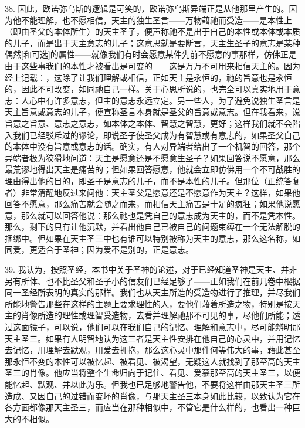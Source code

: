 38. 因此，欧诺弥乌斯的逻辑是可笑的，欧诺弥乌斯异端正是从他那里产生的。因为他不能理解，也不愿相信，天主的独生圣言——万物藉祂而受造——是本性上（即由圣父的本体所生）的天主圣子，便声称祂不是出于自己的本性或本体或本质的儿子，而是出于天主意志的儿子；这意思就是要断言，天主生圣子的意志是某种偶然[和可选]的属性——就像我们有时会愿意某件先前不愿意的事那样，仿佛正是由于这些事我们的本性才被看出是可变的——这是万万不可用来相信天主的。因为经上记载：，这除了让我们理解或相信，正如天主是永恒的，祂的旨意也是永恒的，因此不可改变，如同祂自己一样。关于心思所说的，也完全可以真实地用于意志：人心中有许多意志，但主的意志永远立定。另一些人，为了避免说独生圣言是天主旨意或意志的儿子，便宣称圣言本身就是圣父的旨意或意志。但在我看来，说旨意之旨意、意志之意志，如本体之本体、智慧之智慧，更好；这样我们就不会陷入我们已经驳斥过的谬论，即说圣子使圣父成为有智慧或有意志的，如果圣父自己的本体中没有旨意或意志的话。确实，有人对异端者给出了一个机智的回答，那个异端者极为狡猾地问道：天主是愿意还是不愿意生圣子？如果回答说不愿意，那么最荒谬地得出天主是痛苦的；但如果回答愿意，他就会立即仿佛用一个不可战胜的理由得出他的目的，即圣子是意志的儿子，而不是本性的儿子。但那位（正统答复者）非常清醒地反过来问他：天主圣父是愿意还是不愿意作为天主？这样，如果他回答不愿意，那么痛苦就会随之而来，而相信天主痛苦是十足的疯狂；如果他说愿意，那么就可以回答他说：那么祂也是凭自己的意志成为天主的，而不是凭本性。那么，剩下的只有让他沉默，并看出他自己已被自己的问题束缚在一个无法解脱的捆绑中。但如果在天主圣三中也有谁可以特别被称为天主的意志，那么这名称，如同爱，更适合于圣神；因为爱不是别的，正是意志。\par

39. 我认为，按照圣经，本书中关于圣神的论述，对于已经知道圣神是天主、并非另有所体、也不比圣父和圣子小的信友们已经足够了——正如我们在前几卷中根据同一圣经所表明的真实的那样。我们也从天主所造的受造物进行了推理，并尽我们所能地警告那些在这样的主题上要求理性的人，要他们藉着所造之物，特别是按天主的肖像所造的理性或理智受造物，去看并理解祂那不可见的事，尽他们所能；透过这面镜子，可以说，他们可以在我们自己的记忆、理解和意志中，尽可能辨明那天主圣三。如果有人明智地认为这三者是天主性安排在他自己的心灵中，并用记忆去记忆，用理解去默观，用爱去拥抱，那么这心灵中那件何等伟大的事，藉此甚至那永恒不变的本性可以被忆起、被看见、被渴望，无疑这人就找到了那至高的天主圣三的肖像。他应当将整个生命归向于记住、看见、爱慕那至高的天主圣三，以便能忆起、默观、并以此为乐。但我也已足够地警告他，不要将这样由那天主圣三所造成、又因自己的过错而变坏的肖像，与那天主圣三本身如此比较，以致认为它在各方面都像那天主圣三，而应当在那种相似中，不管它是什么样的，也看出一种巨大的不相似。\par

